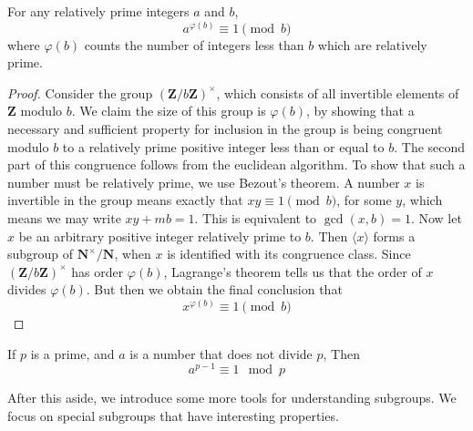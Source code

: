 \begin{corollary}
    For any relatively prime integers $a$ and $b$,
    \[ a^{\varphi(b)} \equiv 1 \pmod{b} \]
    where $\varphi(b)$ counts the number of integers less than $b$ which are relatively prime.
\end{corollary}
\begin{proof}
    Consider the group $\left(\mathbf{Z}/b\mathbf{Z}\right)^\times$, which consists of all invertible elements of $\mathbf{Z}$ modulo $b$. We claim the size of this group is $\varphi(b)$, by showing that a necessary and sufficient property for inclusion in the group is being congruent modulo $b$ to a relatively prime positive integer less than or equal to $b$. The second part of this congruence follows from the euclidean algorithm. To show that such a number must be relatively prime, we use Bezout's theorem. A number $x$ is invertible in the group means exactly that $xy \equiv 1 \pmod{b}$, for some $y$, which means we may write $xy + mb = 1$. This is equivalent to $\gcd(x,b) = 1$. Now let $x$ be an arbitrary positive integer relatively prime to $b$. Then $\langle x \rangle$ forms a subgroup of $\mathbf{N}^\times/\mathbf{N}$, when $x$ is identified with its congruence class. Since $\left(\mathbf{Z}/b\mathbf{Z}\right)^\times$  has order $\varphi(b)$, Lagrange's theorem tells us that the order of $x$ divides $\varphi(b)$. But then we obtain the final conclusion that
    \[ x^{\varphi(b)} \equiv 1 \pmod{b} \]
\end{proof}

\begin{corollary} 
    If $p$ is a prime, and $a$ is a number that does not divide $p$, Then
    \[ a^{p-1} \equiv 1 \mod{p} \]
\end{corollary}

After this aside, we introduce some more tools for understanding subgroups. We focus on special subgroups that have interesting properties.

